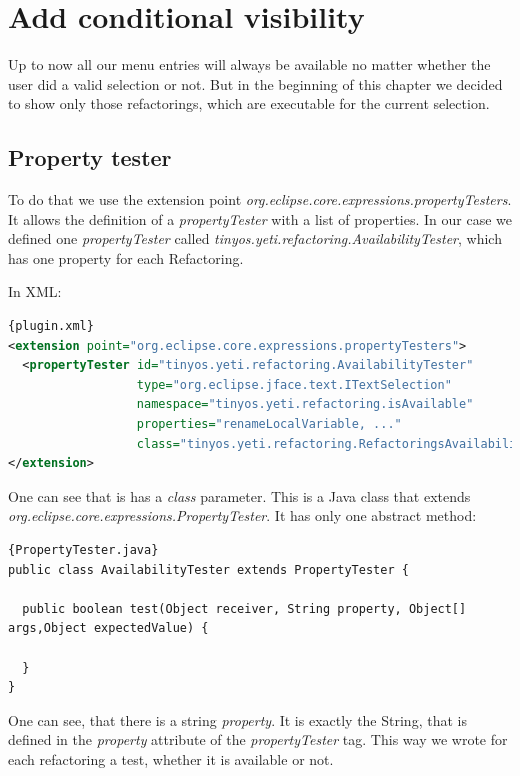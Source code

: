 \documentclass[a4paper,10pt]{report}
\begin{document}
\section{Add conditional visibility}
\label{conditionalVisibility}
Up to now all our menu entries will always be available no matter whether the user did a valid selection or not.
But in the beginning of this chapter we decided to show only those refactorings, which are executable for the current selection.

\subsection{Property tester}
To do that we use the extension point {\it org.eclipse.core.expressions.propertyTesters}.
It allows the definition of a {\it propertyTester} with a list of properties.
In our case we defined one {\it propertyTester} called {\it tinyos.yeti.refactoring.AvailabilityTester}, which has one property for each Refactoring.

In XML:
\begin{lstlisting}[language=XML,caption=Property tester ({\it plugin.xml})]{plugin.xml}
<extension point="org.eclipse.core.expressions.propertyTesters">
  <propertyTester id="tinyos.yeti.refactoring.AvailabilityTester"
                  type="org.eclipse.jface.text.ITextSelection"
                  namespace="tinyos.yeti.refactoring.isAvailable"
                  properties="renameLocalVariable, ..."
                  class="tinyos.yeti.refactoring.RefactoringsAvailabilityTester" />
</extension>
\end{lstlisting}

One can see that is has a {\it class} parameter. This is a Java class that extends \\{\it org.eclipse.core.expressions.PropertyTester}.
It has only one abstract method:
\begin{lstlisting}[caption=extends PropertyTester]{PropertyTester.java}
public class AvailabilityTester extends PropertyTester {

  public boolean test(Object receiver, String property, Object[] args,Object expectedValue) {
    
  }
}
\end{lstlisting}
One can see, that there is a string {\it property}. 
It is exactly the String, that is defined in the {\it property} attribute of the {\it propertyTester} tag.
This way we wrote for each refactoring a test, whether it is available or not.
\end{document}
